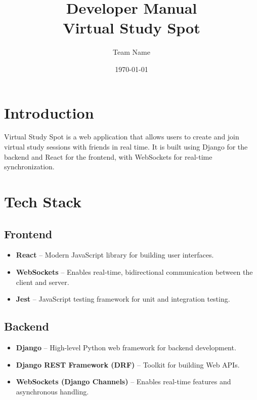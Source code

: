 \documentclass[a4paper,12pt]{article}
\title{\textbf{Developer Manual} \\ Virtual Study Spot}
\author{Team Name}
\date{\today}
\begin{document}
\maketitle



\section{Introduction}

Virtual Study Spot is a web application that allows users to create and join virtual study sessions with friends in real time. It is built using Django for the backend and React for the frontend, with WebSockets for real-time synchronization.



\section{Tech Stack}



\subsection{Frontend}

\begin{itemize}

    \item \textbf{React} – Modern JavaScript library for building user interfaces.

    \item \textbf{WebSockets} – Enables real-time, bidirectional communication between the client and server.

    \item \textbf{Jest} – JavaScript testing framework for unit and integration testing.

\end{itemize}



\subsection{Backend}

\begin{itemize}

    \item \textbf{Django} – High-level Python web framework for backend development.

    \item \textbf{Django REST Framework (DRF)} – Toolkit for building Web APIs.

    \item \textbf{WebSockets (Django Channels)} – Enables real-time features and asynchronous handling.

\end{itemize}
\end{document}

